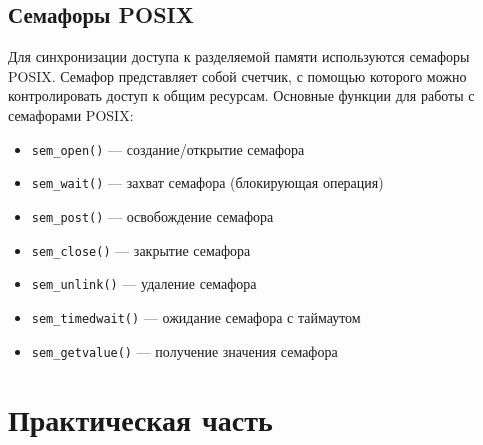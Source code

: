 \documentclass[a4paper,12pt]{article}
\begin{document}
\subsection{Семафоры POSIX}
Для синхронизации доступа к разделяемой памяти используются семафоры POSIX. Семафор представляет собой счетчик, с помощью которого можно контролировать доступ к общим ресурсам.
Основные функции для работы с семафорами POSIX:
\begin{itemize}
    \item \texttt{sem\_open()} — создание/открытие семафора
    \item \texttt{sem\_wait()} — захват семафора (блокирующая операция)
    \item \texttt{sem\_post()} — освобождение семафора
    \item \texttt{sem\_close()} — закрытие семафора
    \item \texttt{sem\_unlink()} — удаление семафора
    \item \texttt{sem\_timedwait()} — ожидание семафора с таймаутом
    \item \texttt{sem\_getvalue()} — получение значения семафора
\end{itemize}
\section{Практическая часть}
\end{document}
